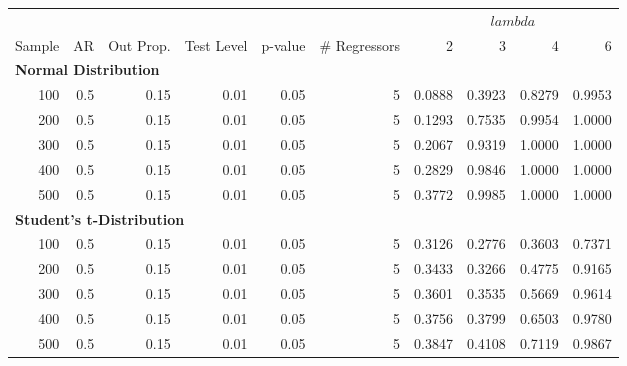 \begin{table}
\centering
\begin{tabular}{r|r|r|r|r|r|r|r|r|r}
\hline
\multicolumn{6}{c|}{ } & \multicolumn{4}{c}{$lambda$} \\
\cline{7-10}
Sample & AR & Out Prop. & Test Level & p-value & \# Regressors & 2 & 3 & 4 & 6\\
\hline
\multicolumn{10}{l}{\textbf{Normal Distribution}}\\
\hline
\hspace{1em}100 & 0.5 & 0.15 & 0.01 & 0.05 & 5 & 0.0888 & 0.3923 & 0.8279 & 0.9953\\
\hline
\hspace{1em}200 & 0.5 & 0.15 & 0.01 & 0.05 & 5 & 0.1293 & 0.7535 & 0.9954 & 1.0000\\
\hline
\hspace{1em}300 & 0.5 & 0.15 & 0.01 & 0.05 & 5 & 0.2067 & 0.9319 & 1.0000 & 1.0000\\
\hline
\hspace{1em}400 & 0.5 & 0.15 & 0.01 & 0.05 & 5 & 0.2829 & 0.9846 & 1.0000 & 1.0000\\
\hline
\hspace{1em}500 & 0.5 & 0.15 & 0.01 & 0.05 & 5 & 0.3772 & 0.9985 & 1.0000 & 1.0000\\
\hline
\multicolumn{10}{l}{\textbf{Student's t-Distribution}}\\
\hline
\hspace{1em}100 & 0.5 & 0.15 & 0.01 & 0.05 & 5 & 0.3126 & 0.2776 & 0.3603 & 0.7371\\
\hline
\hspace{1em}200 & 0.5 & 0.15 & 0.01 & 0.05 & 5 & 0.3433 & 0.3266 & 0.4775 & 0.9165\\
\hline
\hspace{1em}300 & 0.5 & 0.15 & 0.01 & 0.05 & 5 & 0.3601 & 0.3535 & 0.5669 & 0.9614\\
\hline
\hspace{1em}400 & 0.5 & 0.15 & 0.01 & 0.05 & 5 & 0.3756 & 0.3799 & 0.6503 & 0.9780\\
\hline
\hspace{1em}500 & 0.5 & 0.15 & 0.01 & 0.05 & 5 & 0.3847 & 0.4108 & 0.7119 & 0.9867\\
\hline
\end{tabular}
\end{table}
